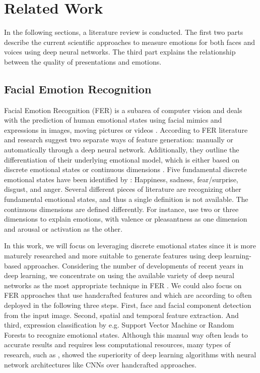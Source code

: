 \section{Related Work}
\label{sec:related_work}
In the following sections, a literature review is conducted. The first two parts describe the current scientific approaches to measure emotions for both faces and voices using deep neural networks. The third part explains the relationship between the quality of presentations and emotions.

\subsection{Facial Emotion Recognition}
\label{subsec:related_work_facial_emotion_recognition}
Facial Emotion Recognition (FER) is a subarea of computer vision and deals with the prediction of human emotional states using facial mimics and expressions in images, moving pictures or videos \cite{jain_extended_2019}.
According to  FER literature and research suggest two separate ways of feature generation: manually or automatically through a deep neural network. Additionally, they outline the differentiation of their underlying emotional model, which is either based on discrete emotional states or continuous dimensions \cite{rosler_reducing_2021}. Five fundamental discrete emotional states have been identified by : Happiness, sadness, fear/surprise, disgust, and anger. Several different pieces of literature are recognizing other fundamental emotional states, and thus a single definition is not available. The continuous dimensions are defined differently. For instance,  use two or three dimensions to explain emotions, with valence or pleasantness as one dimension and arousal or activation as the other.

In this work, we will focus on leveraging discrete emotional states since it is more maturely researched and more suitable to generate features using deep learning-based approaches. Considering the number of developments of recent years in deep learning, we concentrate on using the available variety of deep neural networks as the most appropriate technique in FER \cite{jain_extended_2019}. We could also focus on FER approaches that use handcrafted features and which are according to  often deployed in the following three steps. First, face and facial component detection from the input image. Second, spatial and temporal feature extraction. And third, expression classification by e.g. Support Vector Machine or Random Forests to recognize emotional states. Although this manual way often leads to accurate results and requires less computational resources, many types of research, such as , showed the superiority of deep learning algorithms with neural network architectures like CNNs over handcrafted approaches.

